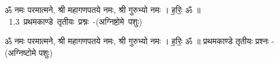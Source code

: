 \documentclass[17pt]{extarticle}
\begin{document}
\begin{titlepage}
    \begin{center}
 
\begin{sanskrit}
    { \Large
    ॐ नमः परमात्मने, श्री महागणपतये नमः, 
श्री गुरुभ्यो नमः । ह॒रिः॒ ॐ ॥ 
    }
    \\
    \vspace{2.5cm}
    \mbox{ \Huge
    1.3     प्रथमकाण्डे तृतीयः प्रश्नः -(अग्निष्टोमे पशुः)   }
\end{sanskrit}
\end{center}

\end{titlepage}
\tableofcontents

ॐ नमः परमात्मने, श्री महागणपतये नमः, 
श्री गुरुभ्यो नमः । ह॒रिः॒ ॐ ॥      प्रथमकाण्डे तृतीयः प्रश्नः -(अग्निष्टोमे पशुः) \newline

\end{document}
